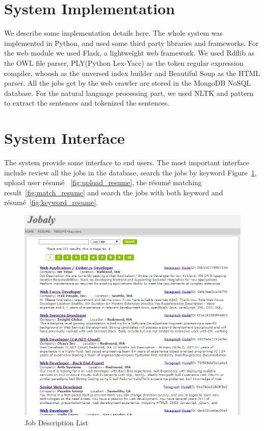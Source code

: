 \section{System Implementation}

We describe some implementation details here. The whole system was implemented in Python, and used some third party libraries and frameworks. For the web module we used Flask, a lightweight web framework. We used Rdflib as the OWL file parser, PLY(Python Lex-Yacc) as the token regular expression compiler, whoosh as the unversed index builder and Beautiful Soup as the HTML parser.  All the jobs get by the web crawler are stored in the MongoDB NoSQL database.  For the natural language processing part, we used NLTK and pattern to extract the sentences and tokenized the sentences.

\section{System Interface}

The system provide some interface to end users. The most important interface include review all the jobs in the database, search the jobs by keyword Figure~\ref{fig:joblist},  upload user r\'esum\'e ~\ref{fig:upload_resume}, the r\'esum\'e matching result~\ref{fig:match_resume} and search the jobs with both keyword and r\'esum\'e~\ref{fig:keyword_resume}.

\begin{figure}[htbp]
  \centering
  \includegraphics[scale=0.5]{images/joblist.png}
  \caption{Job Description List}
  \label{fig:joblist}
\end{figure}


